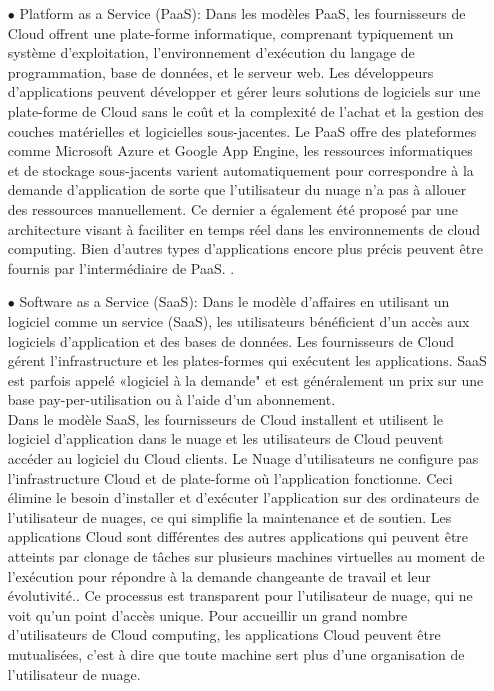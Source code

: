 \begin{itemize}
                \item[\quad $\bullet$] Platform as a Service (PaaS):
                Dans les modèles PaaS, les fournisseurs de Cloud offrent une plate-forme informatique, comprenant typiquement un système d'exploitation, l'environnement d'exécution du langage de programmation, base de données, et le serveur web. Les développeurs d'applications peuvent développer et gérer leurs solutions de logiciels sur une plate-forme de Cloud sans le coût et la complexité de l'achat et la gestion des couches matérielles et logicielles sous-jacentes. Le PaaS offre des plateformes comme Microsoft Azure et Google App Engine, les ressources informatiques et de stockage sous-jacents varient automatiquement pour correspondre à la demande d'application de sorte que l'utilisateur du nuage n'a pas à allouer des ressources manuellement. Ce dernier a également été proposé par une architecture visant à faciliter en temps réel dans les environnements de cloud computing. Bien d’autres types d'applications encore plus précis peuvent être fournis par l'intermédiaire de PaaS.
.
                \item[\quad $\bullet$] Software as a Service (SaaS):
                Dans le modèle d'affaires en utilisant un logiciel comme un service (SaaS), les utilisateurs bénéficient d'un accès aux logiciels d'application et des bases de données. Les fournisseurs de Cloud gérent l'infrastructure et les plates-formes qui exécutent les applications. SaaS est parfois appelé «logiciel à la demande" et est généralement un prix sur une base pay-per-utilisation ou à l'aide d'un abonnement.\\

                Dans le modèle SaaS, les fournisseurs de Cloud installent et utilisent le logiciel d'application dans le nuage et les utilisateurs de Cloud peuvent accéder au logiciel du Cloud clients. Le Nuage d’utilisateurs ne configure  pas l'infrastructure Cloud et de plate-forme où l'application fonctionne. Ceci élimine le besoin d'installer et d'exécuter l'application sur des ordinateurs de l'utilisateur de nuages, ce qui simplifie la maintenance et de soutien. Les applications Cloud sont différentes des autres applications qui peuvent être atteints par clonage de tâches sur plusieurs machines virtuelles au moment de l'exécution pour répondre à la demande changeante de travail et leur évolutivité.. Ce processus est transparent pour l'utilisateur de nuage, qui ne voit qu’un point d'accès unique. Pour accueillir un grand nombre d'utilisateurs de Cloud computing, les applications Cloud peuvent être mutualisées, c’est à dire que toute machine sert plus d'une organisation de l'utilisateur de nuage.\\


\end{itemize}
